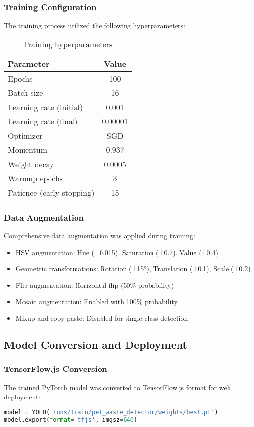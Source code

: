 \documentclass[12pt,a4paper]{article}
\begin{document}
\subsubsection{Training Configuration}
The training process utilized the following hyperparameters:
\begin{table}[H]
\centering
\begin{tabular}{lc}
\toprule
\textbf{Parameter} & \textbf{Value} \\
\midrule
Epochs & 100 \\
Batch size & 16 \\
Learning rate (initial) & 0.001 \\
Learning rate (final) & 0.00001 \\
Optimizer & SGD \\
Momentum & 0.937 \\
Weight decay & 0.0005 \\
Warmup epochs & 3 \\
Patience (early stopping) & 15 \\
\bottomrule
\end{tabular}
\caption{Training hyperparameters}
\label{tab:training_params}
\end{table}

\subsubsection{Data Augmentation}
Comprehensive data augmentation was applied during training:
\begin{itemize}
    \item HSV augmentation: Hue (±0.015), Saturation (±0.7), Value (±0.4)
    \item Geometric transformations: Rotation (±15°), Translation (±0.1), Scale (±0.2)
    \item Flip augmentation: Horizontal flip (50\% probability)
    \item Mosaic augmentation: Enabled with 100\% probability
    \item Mixup and copy-paste: Disabled for single-class detection
\end{itemize}

\subsection{Model Conversion and Deployment}

\subsubsection{TensorFlow.js Conversion}
The trained PyTorch model was converted to TensorFlow.js format for web deployment:
\begin{lstlisting}[language=Python, caption=TensorFlow.js Conversion]
model = YOLO('runs/train/pet_waste_detector/weights/best.pt')
model.export(format='tfjs', imgsz=640)
\end{lstlisting}
\end{document}
